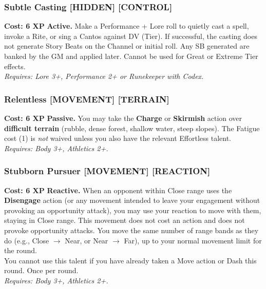 \documentclass[12pt,a4paper]{book}
\begin{document}
\subsubsection*{Subtle Casting \textnormal{[HIDDEN] [CONTROL]}}
\label{talent:subtle-casting}
\textbf{Cost: 6 XP} \textbf{Active.} Make a Performance + Lore roll to quietly cast a spell, invoke a Rite, or sing a Cantos against DV (Tier). If successful, the casting does not generate Story Beats on the Channel or initial roll. Any SB generated are banked by the GM and applied later. Cannot be used for Great or Extreme Tier effects. \\
\textit{Requires: Lore 3+, Performance 2+ or Runekeeper with Codex.}

\subsubsection*{Relentless \textnormal{[MOVEMENT] [TERRAIN]}}
\label{talent:relentless}
\textbf{Cost: 6 XP} \textbf{Passive.} You may take the \textbf{Charge} or \textbf{Skirmish} action over \textbf{difficult terrain} (rubble, dense forest, shallow water, steep slopes). The Fatigue cost (1) is \emph{not} waived unless you also have the relevant Effortless talent. \\
\textit{Requires: Body 3+, Athletics 2+.}

\subsubsection*{Stubborn Pursuer \textnormal{[MOVEMENT] [REACTION]}}
\label{talent:stubborn-pursuer}
\textbf{Cost: 6 XP} \textbf{Reactive.} When an opponent within Close range uses the \textbf{Disengage} action (or any movement intended to leave your engagement without provoking an opportunity attack), you may use your reaction to move with them, staying in Close range. This movement does not cost an action and does not provoke opportunity attacks. You move the same number of range bands as they do (e.g., Close $\rightarrow$ Near, or Near $\rightarrow$ Far), up to your normal movement limit for the round. \\
You cannot use this talent if you have already taken a Move action or Dash this round. Once per round. \\
\textit{Requires: Body 3+, Athletics 2+.}
\end{document}
